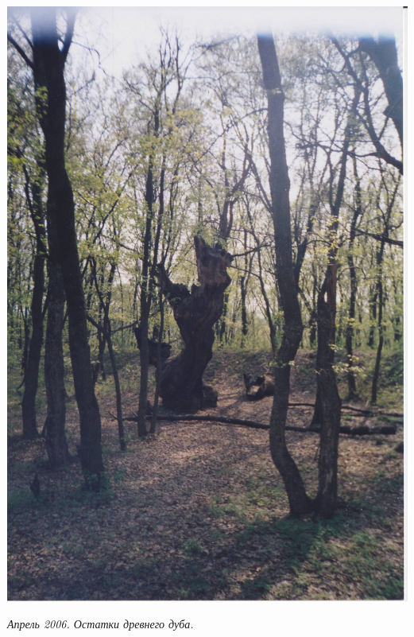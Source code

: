 \newpage
\vspace*{\fill}
\begin{center}
\includegraphics[width=\textwidth]{chast-lys-gory/zazver/stardub.jpg}

\textit{Апрель 2006. Остатки древнего дуба.}
\end{center}
\vspace*{\fill}
\newpage
\vspace*{\fill}

